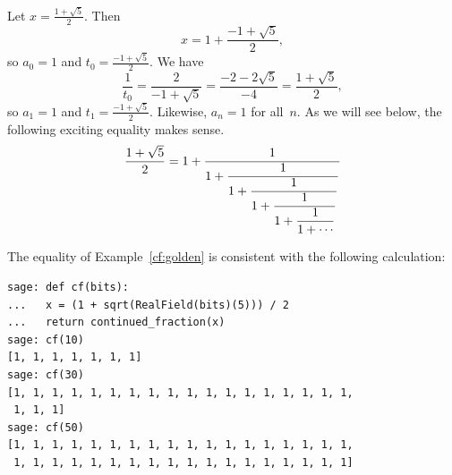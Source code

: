 \begin{example}\label{cf:golden}
Let $x = \frac{1+\sqrt{5}}{2}.$  Then
$$
   x = 1 + \frac{-1 + \sqrt{5}}{2},
$$
so $a_0 = 1$ and $t_0 = \frac{-1+\sqrt{5}}{2}$.
We have
$$
  \frac{1}{t_0} = \frac{2}{-1+\sqrt{5}} = \frac{-2-2\sqrt{5}}{-4}
        = \frac{1+\sqrt{5}}{2},
$$
so $a_1 = 1$ and $t_1 =  \frac{-1+\sqrt{5}}{2}$.
Likewise, $a_n = 1$ for all~$n$.
As we will see below, the following exciting
equality makes sense.
$$\frac{1+\sqrt{5}}{2} =
1 + \frac{1}{\displaystyle 1 + \frac{1}{\displaystyle 1 + \frac{1}{\displaystyle 1 + \frac{1}{\displaystyle 1 + \frac{1}{\displaystyle 1 + \cdots}}}}}
$$
\end{example}
\begin{sg}
The equality of Example~\ref{cf:golden}
is consistent with the following \sage calculation:
\begin{verbatim}
sage: def cf(bits):
...   x = (1 + sqrt(RealField(bits)(5))) / 2
...   return continued_fraction(x)
sage: cf(10)
[1, 1, 1, 1, 1, 1, 1]
sage: cf(30)
[1, 1, 1, 1, 1, 1, 1, 1, 1, 1, 1, 1, 1, 1, 1, 1, 1, 1,
 1, 1, 1]
sage: cf(50)
[1, 1, 1, 1, 1, 1, 1, 1, 1, 1, 1, 1, 1, 1, 1, 1, 1, 1,
 1, 1, 1, 1, 1, 1, 1, 1, 1, 1, 1, 1, 1, 1, 1, 1, 1, 1]
\end{verbatim}
\end{sg}

